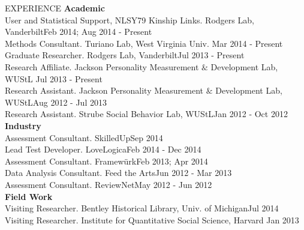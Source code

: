 \documentclass {resume}
\begin{document}
\begin{rSection}{\textrm{EXPERIENCE}}
{\large \textbf{Academic}}\\
User and Statistical Support, NLSY79 Kinship Links. Rodgers Lab, Vanderbilt\hfill Feb 2014; Aug 2014 - Present\smallskip\\
Methods Consultant. Turiano Lab, West Virginia Univ. \hfill Mar 2014 - Present\smallskip\\%
Graduate Researcher. Rodgers Lab, Vanderbilt\hfill Jul 2013 - Present\smallskip\\
Research Affiliate. Jackson Personality Measurement $\&$ Development Lab, WUStL \hfill Jul 2013 - Present\smallskip\\
Research Assistant. Jackson Personality Measurement $\&$ Development Lab, WUStL\hfill Aug 2012 - Jul 2013\smallskip\\
Research Assistant. Strube Social Behavior Lab, WUStL\hfill Jan 2012 - Oct 2012\medskip\\
{\large \textbf{Industry}}\\
Assessment Consultant. SkilledUp\hfill Sep 2014\smallskip\\
Lead Test Developer. LoveLogica\hfill Feb 2014 - Dec 2014\smallskip\\
Assessment Consultant. Framew\"{u}rk\hfill Feb 2013; Apr 2014\smallskip\\
Data Analysis Consultant. Feed the Arts\hfill Jun 2012 - Mar 2013\smallskip\\
Assessment Consultant. ReviewNet\hfill May 2012 - Jun 2012\medskip\\
{\large \textbf{Field Work}}\\
Visiting Researcher. Bentley Historical Library, Univ. of Michigan\hfill Jul 2014\smallskip\\
Visiting Researcher. Institute for Quantitative Social Science, Harvard \hfill Jan 2013%
\end{rSection}%
\end{document}
